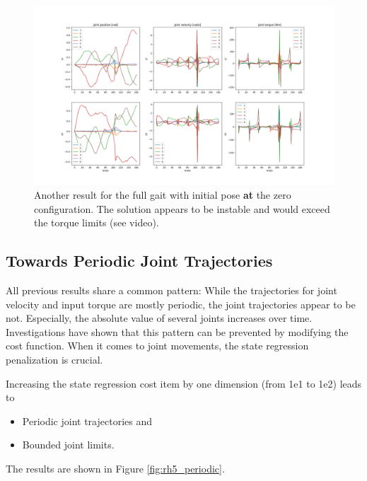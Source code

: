 \begin{figure}[h!]
\centering
\includegraphics[width=1\linewidth]{Media/Crocoddyl/RH5/InitPoseVariants/RH5GaitInitZeroConfig_Solution_FailedSolver.png}
\caption{Another result for the full gait with initial pose \textbf{at} the zero configuration. The solution appears to be instable and would exceed the torque limits (see video).}
\label{fig:rh5_init_at_zero_failed_solver}
\end{figure}

\subsection{Towards Periodic Joint Trajectories}
All previous results share a common pattern: While the trajectories for joint velocity and input torque are mostly periodic, the joint trajectories appear to be not. Especially, the absolute value of several joints increases over time. Investigations have shown that this pattern can be prevented by modifying the cost function. When it comes to joint movements, the state regression penalization is crucial. 

Increasing the state regression cost item by one dimension (from 1e1 to 1e2) leads to
\begin{itemize}
\item Periodic joint trajectories and
\item Bounded joint limits. 
\end{itemize} 
The results are shown in Figure \ref{fig:rh5_periodic}.
   
